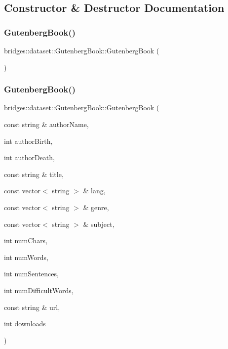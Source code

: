\subsection{Constructor \& Destructor Documentation}
\mbox{\label{classbridges_1_1dataset_1_1_gutenberg_book_ab88639acb3d28345f1db063d603f1123}} 
\subsubsection{\texorpdfstring{Gutenberg\+Book()}{GutenbergBook()}\hspace{0.1cm}{\footnotesize\ttfamily [1/2]}}
{\footnotesize\ttfamily bridges\+::dataset\+::\+Gutenberg\+Book\+::\+Gutenberg\+Book (\begin{DoxyParamCaption}{ }\end{DoxyParamCaption})\hspace{0.3cm}{\ttfamily [inline]}}

\mbox{\label{classbridges_1_1dataset_1_1_gutenberg_book_abe1720623c08625c3e8760830d6c1aa0}} 
\subsubsection{\texorpdfstring{Gutenberg\+Book()}{GutenbergBook()}\hspace{0.1cm}{\footnotesize\ttfamily [2/2]}}
{\footnotesize\ttfamily bridges\+::dataset\+::\+Gutenberg\+Book\+::\+Gutenberg\+Book (\begin{DoxyParamCaption}\item[{const string \&}]{author\+Name,  }\item[{int}]{author\+Birth,  }\item[{int}]{author\+Death,  }\item[{const string \&}]{title,  }\item[{const vector$<$ string $>$ \&}]{lang,  }\item[{const vector$<$ string $>$ \&}]{genre,  }\item[{const vector$<$ string $>$ \&}]{subject,  }\item[{int}]{num\+Chars,  }\item[{int}]{num\+Words,  }\item[{int}]{num\+Sentences,  }\item[{int}]{num\+Difficult\+Words,  }\item[{const string \&}]{url,  }\item[{int}]{downloads }\end{DoxyParamCaption})\hspace{0.3cm}{\ttfamily [inline]}}



